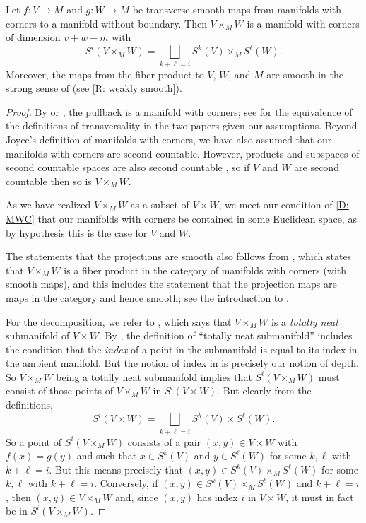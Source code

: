 \begin{theorem}\label{pullback}
	Let $f \colon V \to M$ and $g \colon W \to M$ be transverse smooth maps from manifolds with corners to a manifold without boundary.
	Then $V \times_M W$ is a manifold with corners of dimension $v+w-m$ with
	\begin{equation*}
		S^i(V \times_M W) = \bigsqcup_{k + \ell = i} S^k(V) \times_M S^\ell(W).
	\end{equation*}
	Moreover, the maps from the fiber product to $V$, $W$, and $M$ are smooth in the strong sense of \cite[Definition 3.1]{Joy12} (see \cref{R: weakly smooth}).
\end{theorem}
\begin{proof}
By  \cite[Theorem 6.4]{Joy12} or \cite[Theorem 7.2.7]{MaDo92}, the pullback is a manifold with corners; see \cite[Remark 6.3]{Joy12} for the equivalence of the definitions of transversality in the two papers given our assumptions.
Beyond Joyce's definition of manifolds with corners, we have also assumed that our manifolds with corners are second countable.
However, products and subspaces of second countable spaces are also second countable \cite[Theorem 30.2]{Mu00}, so if $V$ and $W$ are second countable then so is $V \times_M W$. 

As we have realized $V \times_M W$ as a subset of $V \times W$, we meet our condition of \cref{D: MWC} that our manifolds with corners be contained in some Euclidean space, as by hypothesis this is the case for $V$ and $W$.

The statements that the projections are smooth also follows from \cite[Theorem 6.4]{Joy12}, which states that $V\times_MW$ is a fiber product in the category of manifolds with corners (with smooth maps), and this includes the statement that the projection maps are maps in the category and hence smooth; see the introduction to \cite[Section 6]{Joy12}.

For the decomposition, we refer to \cite[Theorem 7.2.7.a]{MaDo92}, which says that $V\times_MW$ is a \textit{totally neat} submanifold of $V\times W$.
By \cite[Definition 3.1.10]{MaDo92}, the definition of ``totally neat submanifold'' includes the condition that the \textit{index} of a point in the submanifold is equal to its index in the ambient manifold.
But the notion of index in \cite{MaDo92} is precisely our notion of depth. So $V\times_MW$ being a totally neat submanifold implies that $S^i(V\times_MW)$ must consist of those points of $V\times_MW$ in $S^i(V\times W)$.
But clearly from the definitions,
$$S^i(V\times W)=\bigsqcup_{k + \ell = i} S^k(V) \times S^\ell(W).$$
So a point of $S^i(V\times_M W)$ consists of a pair $(x,y)\in V\times W$ with $f(x)=g(y)$ and such that $x\in S^k(V)$ and $y\in S^\ell(W)$ for some $k,\ell$ with $k+\ell=i$.
But this means precisely that $(x,y)\in S^k(V) \times_M S^\ell(W)$ for some $k,\ell$ with $k+\ell=i$.
Conversely, if $(x,y)\in S^k(V) \times_M S^\ell(W)$ and $k+\ell=i$, then $(x,y)\in V\times_MW$ and, since $(x,y)$ has index $i$ in $V\times W$, it must in fact be in $S^i(V\times_M W)$.
\end{proof}

